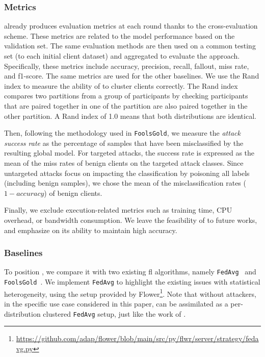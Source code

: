 \subsubsection{Metrics\label{sec:eval.methodo.metrics}}

\thecontrib already produces evaluation metrics at each round thanks to the cross-evaluation scheme.
These metrics are related to the model performance based on the validation set.
The same evaluation methods are then used on a common testing set (to each initial client dataset) and aggregated to evaluate the approach.
Specifically, these metrics include accuracy, precision, recall, fallout, miss rate, and f1-score.
The same metrics are used for the other baselines.
We use the Rand index to measure the ability of \thecontrib to cluster clients correctly.
The Rand index compares two partitions from a group of participants by checking participants that are paired together in one of the partition are also paired together in the other partition. 
A Rand index of 1.0 means that both distributions are identical.

Then, following the methodology used in \texttt{FoolsGold}, we measure the \emph{attack success rate} as the percentage of samples that have been misclassified by the resulting global model.
For targeted attacks, the success rate is expressed as the mean of the miss rates of benign clients on the targeted attack classes.
Since untargeted attacks focus on impacting the classification by poisoning all labels (including benign samples), we chose the mean of the misclassification rates (\ie $1-accuracy$) of benign clients.

Finally, we exclude execution-related metrics such as training time, CPU overhead, or bandwidth consumption.
We leave the feasibility of \thecontrib to future works, and emphasize on its ability to maintain high accuracy.


\subsubsection{Baselines\label{sec:eval.setup.base}}

To position \thecontrib, we compare it with two existing \gls{fl} algorithms, namely \texttt{FedAvg}~\cite{mcmahan_communication-efficient_2017} and \texttt{FoolsGold}~\cite{fung_limitations_2020}.
We implement \texttt{FedAvg} to highlight the existing issues with statistical heterogeneity, using the setup provided by Flower\footnote{\url{https://github.com/adap/flower/blob/main/src/py/flwr/server/strategy/fedavg.py}}.
Note that without attackers, in the specific use case considered in this paper, \thecontrib can be assimilated as a per-distribution clustered \texttt{FedAvg} setup, just like the work of \cite{ye_pfedsa_2023}.

